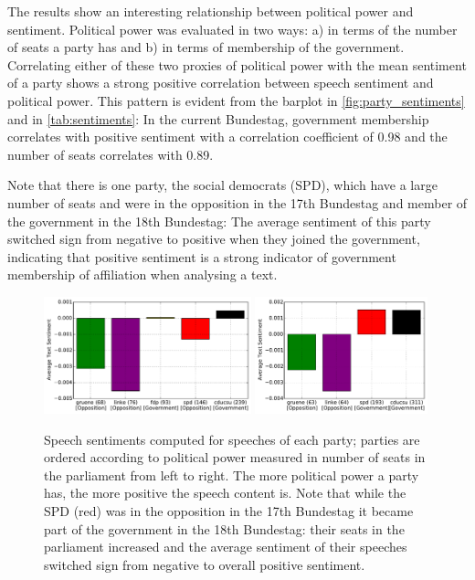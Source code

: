 \documentclass[runningheads,a4paper]{llncs}
\begin{document}
The results show an interesting relationship between political power and sentiment. Political power was evaluated in two ways: a) in terms of the number of seats a party has and b) in terms of membership of the government. Correlating either of these two proxies of political power with the mean sentiment of a party shows a strong positive correlation between speech sentiment and political power. This pattern is evident from the barplot in \autoref{fig:party_sentiments} and in \autoref{tab:sentiments}: In the current Bundestag, government membership correlates with positive sentiment with a correlation coefficient of 0.98 and the number of seats correlates with 0.89. 

Note that there is one party, the social democrats (SPD), which have a large number of seats and were in the opposition in the 17th Bundestag and member of the government in the 18th Bundestag: The average sentiment of this party switched sign from negative to positive when they joined the government, indicating that positive sentiment is a strong indicator of government membership of affiliation when analysing a text. 

\begin{figure}
\begin{center}
\includegraphics[width=6cm]{images/party-sentiments-17.pdf}  \hfill \includegraphics[width=5cm]{images/party-sentiments-18.pdf} 
%
\end{center}
\caption{
\label{fig:party_sentiments}
Speech sentiments computed for speeches of each party; parties are ordered according to political power measured in number of seats in the parliament from left to right. The more political power a party has, the more positive the speech content is. Note that while the SPD (red) was in the opposition in the 17th Bundestag it became part of the government in the 18th Bundestag: their seats in the parliament increased and the average sentiment of their speeches switched sign from negative to overall positive sentiment.
}
\end{figure}
\end{document}
